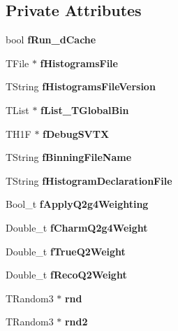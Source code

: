 \subsection*{Private Attributes}
\begin{CompactItemize}
\item 
bool \textbf{f\-Run\_\-d\-Cache}\label{classTMiniNtupleAnalyzer_6f81e43a548bc42e88b97ba89e3b2ea4}

\item 
TFile $\ast$ \textbf{f\-Histograms\-File}\label{classTMiniNtupleAnalyzer_7117078c305fc5aeb484503408fce4d8}

\item 
TString \textbf{f\-Histograms\-File\-Version}\label{classTMiniNtupleAnalyzer_203a35b01f771f192be44cb7255d95f9}

\item 
TList $\ast$ \textbf{f\-List\_\-TGlobal\-Bin}\label{classTMiniNtupleAnalyzer_ab102b41f9e4f98a97b7a23e44098ad4}

\item 
TH1F $\ast$ \textbf{f\-Debug\-SVTX}\label{classTMiniNtupleAnalyzer_88182d7246cb4a9f90e0a21b027ac757}

\item 
TString \textbf{f\-Binning\-File\-Name}\label{classTMiniNtupleAnalyzer_4fb9778772f4b02397900313981398ff}

\item 
TString \textbf{f\-Histogram\-Declaration\-File}\label{classTMiniNtupleAnalyzer_cf1dbe9a923f244a20f259a65ca5c58c}

\item 
Bool\_\-t \textbf{f\-Apply\-Q2g4Weighting}\label{classTMiniNtupleAnalyzer_3333cca9f37c521d8a469fce22ef62a9}

\item 
Double\_\-t \textbf{f\-Charm\-Q2g4Weight}\label{classTMiniNtupleAnalyzer_597247d64ebd4e2c250adbeaa61a0204}

\item 
Double\_\-t \textbf{f\-True\-Q2Weight}\label{classTMiniNtupleAnalyzer_828cc55ebbe3891d6efbcbbefbf7487f}

\item 
Double\_\-t \textbf{f\-Reco\-Q2Weight}\label{classTMiniNtupleAnalyzer_9f3b6565489bb61f939c0c2452c256e6}

\item 
TRandom3 $\ast$ \textbf{rnd}\label{classTMiniNtupleAnalyzer_0bc634b7c6811ebed6e7575488ff2c4a}

\item 
TRandom3 $\ast$ \textbf{rnd2}\label{classTMiniNtupleAnalyzer_c3bda989da04d86057b764a6a23a4339}


\end{CompactItemize}
